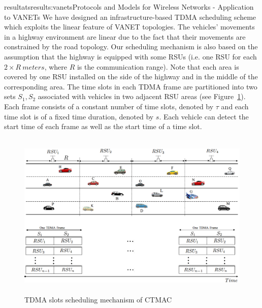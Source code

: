 \documentclass{ra2016}
\begin{document}
\begin{module}{resultats}{results:vanets}{Protocols and Models for Wireless Networks - Application to VANETs}
We have designed an infrastructure-based TDMA scheduling scheme which exploits the linear feature of VANET topologies. The 
vehicles' movements in a highway environment are linear due to the fact that their movements are constrained by the road topology. Our 
scheduling mechanism is also based on the assumption that the highway is equipped with some RSUs (i.e. one RSU 
for each $2\times R~meters$, where $R$ is the communication range). Note that each area is covered by one RSU installed on 
the side of the highway and in the middle of the corresponding area. The time slots in each TDMA 
frame are partitioned into two sets $S_1, S_2$ associated with vehicles in two adjacent RSU 
areas (see Figure~\ref{fig:CTSA}). Each frame consists of a constant number of time slots, denoted by $\tau$ and each time 
slot is of a fixed time duration, denoted by $s$. Each vehicle can detect the start time of each frame as well as the 
start time of a time slot. 

\begin{figure}[!htbp]
    \begin{center}
        \includegraphics[height=8cm,width=14cm]{IMG/CTMACprinciple.png}
        \caption{TDMA slots scheduling mechanism of CTMAC}
        \label{fig:CTSA}
    \end{center}
\end{figure}


\end{module}
\end{document}
